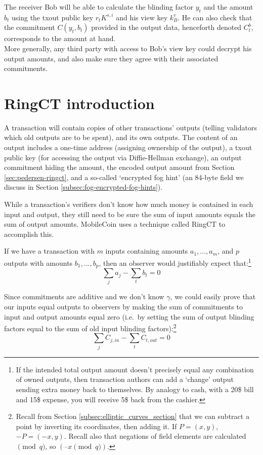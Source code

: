 The receiver Bob will be able to calculate the blinding factor $y_t$ and the amount $b_t$ using the txout public key $r_t K^{s,i}$ and his view key $k_B^v$. He can also check that the commitment $C(y_t, b_t)$ provided in the output data, henceforth denoted $C_t^b$, corresponds to the amount at hand.\\

More generally, any third party with access to Bob’s view key could decrypt his output amounts, and also make sure they agree with their associated commitments.



\section{RingCT introduction}
\label{sec:ringct-introduction}

A transaction will contain copies of other transactions' outputs (telling validators which old outputs are to be spent), and its own outputs. The content of an output includes a one-time address (assigning ownership of the output), a txout public key (for accessing the output via Diffie-Hellman exchange), an output commitment hiding the amount, the encoded output amount from Section \ref{sec:pedersen-ringct}, and a so-called `encrypted fog hint' (an 84-byte field we discuss in Section \ref{subsec:fog-encrypted-fog-hints}).

While a transaction's verifiers don’t know how much money is contained in each input and output, they still need to be sure the sum of input amounts equals the sum of output amounts. MobileCoin uses a technique called RingCT \cite{MRL-0005-ringct} to accomplish this.

If we have a transaction with $m$ inputs containing amounts \(a_1, ..., a_m\), and $p$ outputs with amounts \(b_1, ..., b_p\), then an observer would justifiably expect that:\footnote{If the intended total output amount doesn't precisely equal any combination of owned outputs, then transaction authors can add a `change' output sending extra money back to themselves. By analogy to cash, with a 20\$ bill and 15\$ expense, you will receive 5\$ back from the cashier.}\vspace{.175cm}
\[\sum_j a_j - \sum_t b_t = 0\]

Since commitments are additive and we don't know $\gamma$, we could easily prove that our inputs equal outputs to observers by making the sum of commitments to input and output amounts equal zero (i.e.\ by setting the sum of output blinding factors equal to the sum of old input blinding factors):\footnote{Recall from Section \ref{subsec:elliptic_curves_section} that we can subtract a point by inverting its coordinates, then adding it. If $P = (x, y)$, $-P = (-x, y)$. Recall also that negations of field elements are calculated$\pmod q$, so $(–x \pmod q)$.}\vspace{.175cm}
\[\sum_{j}{C_{j, in}} - \sum_{t}{C_{t, out}} = 0\]

